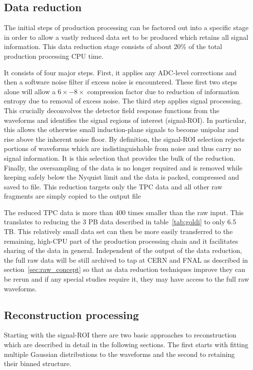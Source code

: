 \subsection{Data reduction}
\label{sec:datareduc}

The initial steps of production processing can be factored out into a
specific stage in order to allow a vastly reduced data set to be
produced which retains all signal information.  This data reduction
stage consists of about 20\% of the total production processing CPU
time.

It consists of four major steps.  First, it applies any ADC-level
corrections and then a software noise filter if excess noise is
encountered.  These first two steps alone will allow a
$6\times - 8\times$ compression factor due to reduction of information
entropy due to removal of excess noise.  The third step applies signal
processing.  This crucially deconvolves the detector field response
functions from the waveforms and identifies the signal regions of
interest (signal-ROI).  In particular, this allows the otherwise small
induction-plane signals to become unipolar and rise above the inherent
noise floor.  By definition, the signal-ROI selection rejects portions
of waveforms which are indistinguishable from noise and thus carry no
signal information.  It is this selection that provides the bulk of
the reduction.  Finally, the oversampling of the data is no longer
required and is removed while keeping safely below the Nyquist limit
and the data is packed, compressed and saved to file.  This reduction
targets only the TPC data and all other raw fragments are simply
copied to the output file

The reduced TPC data is more than 400 times smaller than the raw
input. This translates to reducing the 3 PB data described in
table~\ref{tab:goldi} to only 6.5 TB.  This relatively small data set
can then be more easily transferred to the remaining, high-CPU part of
the production processing chain and it facilitates sharing of the data
in general.  Independent of the output of the data reduction, the full
raw data will be still archived to tap at CERN and FNAL as described
in section~\ref{sec:raw_concept} so that as data reduction techniques
improve they can be rerun and if any special studies require it, they
may have access to the full raw waveforms.



\subsection{Reconstruction processing}
\label{sec:prod-process}

Starting with the signal-ROI there are two basic approaches to
reconstruction which are described in detail in the following
sections.  The first starts with fitting multiple Gaussian
distributions to the waveforms and the second to retaining their
binned structure.

